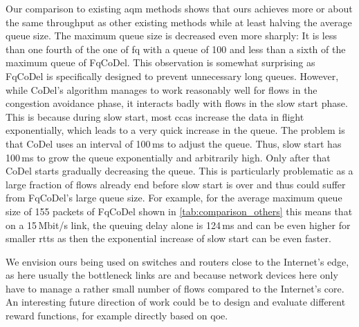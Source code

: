 \documentclass[conference]{IEEEtran}
\begin{document}
Our comparison to existing \gls{aqm} methods shows that \gls{ours} achieves more or about the same throughput as other existing methods while at least halving the average queue size. The maximum queue size is decreased even more sharply: It is less than one fourth of the one of fq with a queue of 100 and less than a sixth of the maximum queue of FqCoDel. This observation is somewhat surprising as FqCoDel is specifically designed to prevent unnecessary long queues. However, while CoDel's algorithm manages to work reasonably well for flows in the congestion avoidance phase, it interacts badly with flows in the slow start phase. This is because during slow start, most \glspl{cca} increase the data in flight exponentially, which leads to a very quick increase in the queue. The problem is that CoDel uses an interval of 100\,ms to adjust the queue. Thus, slow start has 100\,ms to grow the queue exponentially and arbitrarily high. Only after that CoDel starts gradually decreasing the queue. This is particularly problematic as a large fraction of flows already end before slow start is over \cite{jurkiewicz_flow_2020} and thus could suffer from FqCoDel's large queue size. For example, for the average maximum queue size of 155 packets of FqCoDel shown in \autoref{tab:comparison_others} this means that on a 15\,Mbit/s link, the queuing delay alone is 124\,ms and can be even higher for smaller \glspl{rtt} as then the exponential increase of slow start can be even faster. 


We envision \gls{ours} being used on switches and routers close to the Internet's edge, as here usually the bottleneck links are and because network devices here only have to manage a rather small number of flows compared to the Internet's core. An interesting future direction of work could be to design and evaluate different reward functions, for example directly based on \gls{qoe}. 



\end{document}
